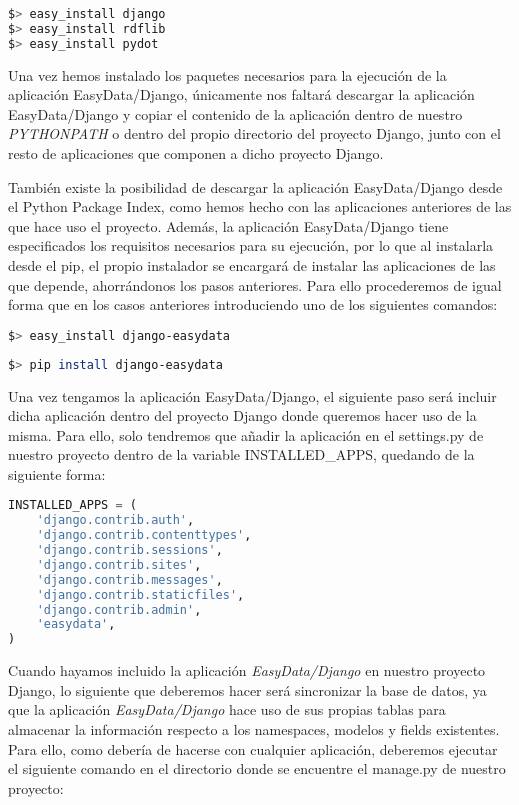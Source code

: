 \begin{lstlisting}[frame=L, language=bash, basicstyle=\footnotesize]
$> easy_install django
$> easy_install rdflib
$> easy_install pydot
\end{lstlisting}

Una vez hemos instalado los paquetes necesarios para la ejecución de la
aplicación EasyData/Django, únicamente nos faltará descargar la aplicación
EasyData/Django y copiar el contenido de la aplicación dentro de nuestro
\textit{PYTHONPATH} o dentro del propio directorio del proyecto Django, junto
con el resto de aplicaciones que componen a dicho proyecto Django.

También existe la posibilidad de descargar la aplicación EasyData/Django desde
el Python Package Index, como hemos hecho con las aplicaciones anteriores de las
que hace uso el proyecto. Además, la aplicación EasyData/Django tiene
especificados los requisitos necesarios para su ejecución, por lo que al
instalarla desde el pip, el propio instalador se encargará de instalar las
aplicaciones de las que depende, ahorrándonos los pasos anteriores. Para ello
procederemos de igual forma que en los casos anteriores introduciendo uno de los
siguientes comandos:

\begin{lstlisting}[frame=L, language=bash, basicstyle=\footnotesize]
$> easy_install django-easydata
\end{lstlisting}

\begin{lstlisting}[frame=L, language=bash, basicstyle=\footnotesize]
$> pip install django-easydata
\end{lstlisting}

Una vez tengamos la aplicación EasyData/Django, el siguiente paso será incluir
dicha aplicación dentro del proyecto Django donde queremos hacer uso de la
misma. Para ello, solo tendremos que añadir la aplicación en el settings.py de
nuestro proyecto dentro de la variable \mbox{INSTALLED\_APPS}, quedando de la
siguiente forma:

\begin{lstlisting}[frame=L, language=Python, basicstyle=\footnotesize]
INSTALLED_APPS = (
    'django.contrib.auth',
    'django.contrib.contenttypes',
    'django.contrib.sessions',
    'django.contrib.sites',
    'django.contrib.messages',
    'django.contrib.staticfiles',
    'django.contrib.admin',
    'easydata',
)
\end{lstlisting}

Cuando hayamos incluido la aplicación \textit{EasyData/Django} en nuestro
proyecto Django, lo siguiente que deberemos hacer será sincronizar la base de
datos, ya que la aplicación \textit{EasyData/Django} hace uso de sus propias
tablas para almacenar la información respecto a los namespaces, modelos y fields
existentes. Para ello, como debería de hacerse con cualquier aplicación,
deberemos ejecutar el siguiente comando en el directorio donde se encuentre el
manage.py de nuestro proyecto:

